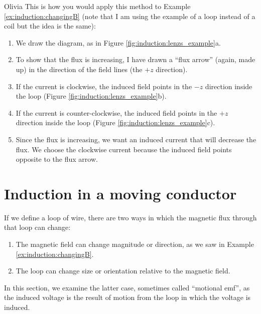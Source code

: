 \begin{studentOpinion}{Olivia}
This is how you would apply this method to Example \ref{ex:induction:changingB} (note that I am using the example of a loop instead of a coil but the idea is the same):
\begin{enumerate}
\item We draw the diagram, as in Figure \ref{fig:induction:lenzs_example}a.  
\item To show that the flux is increasing, I have drawn a ``flux arrow'' (again, made up) in the direction of the field lines (the $+z$ direction).
\item If the current is clockwise, the induced field points in the $-z$ direction inside the loop (Figure \ref{fig:induction:lenzs_example}b).
\item If the current is counter-clockwise, the induced field points in the $+z$ direction inside the loop (Figure \ref{fig:induction:lenzs_example}c).
\item Since the flux is increasing, we want an induced current that will decrease the flux. We choose the clockwise current because the induced field points opposite to the flux arrow. 
\end{enumerate}
\end{studentOpinion}


\section{Induction in a moving conductor}
If we define a loop of wire, there are two ways in which the magnetic flux through that loop can change:
\begin{enumerate}
\item The magnetic field can change magnitude or direction, as we saw in Example \ref{ex:induction:changingB}.
\item The loop can change size or orientation relative to the magnetic field.
\end{enumerate}
In this section, we examine the latter case, sometimes called ``motional emf'', as the induced voltage is the result of motion from the loop in which the voltage is induced. 

